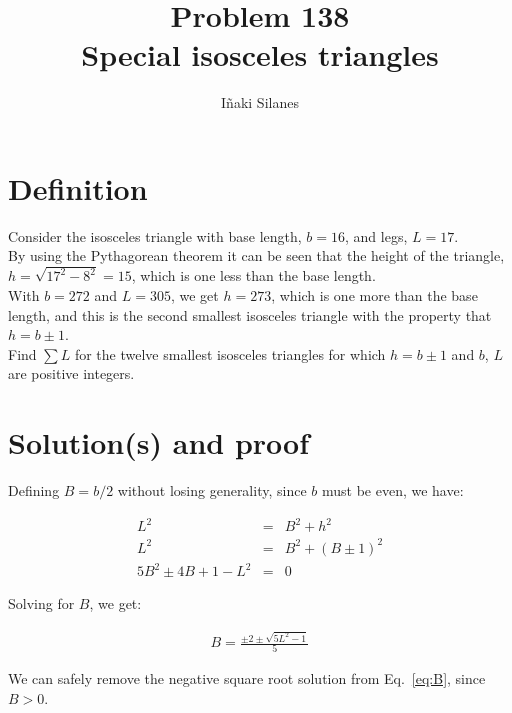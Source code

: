 \documentclass[english]{article}
\begin{document}
\newcommand{\mc}{\multicolumn}
\newcommand{\mr}{\multirow}
\newcommand{\cw}{\columnwidth}
\newcommand{\ig}[2]{\texttt{[image: \#2]}}

\title{Problem 138\\Special isosceles triangles}
\author{I\~naki Silanes}
\maketitle

\section{Definition}

Consider the isosceles triangle with base length, $b = 16$, and legs, $L = 17$.\\

By using the Pythagorean theorem it can be seen that the height of the triangle, $h = \sqrt{17^2 - 8^2} = 15$, which is one less than the base length.\\

With $b = 272$ and $L = 305$, we get $h = 273$, which is one more than the base length, and this is the second smallest isosceles triangle with the property that $h = b \pm 1$.\\

Find $\sum L$ for the twelve smallest isosceles triangles for which $h = b \pm 1$ and $b$, $L$ are positive integers.


\section{Solution(s) and proof}

Defining $B = b/2$ without losing generality, since $b$ must be even, we have:

\begin{eqnarray}
L^2 & = & B^2 + h^2 \\
L^2 & = & B^2 + (B \pm 1)^2 \\
5B^2 \pm 4B + 1 - L^2 & = & 0\label{eq:L2}
\end{eqnarray}

Solving for $B$, we get:

\begin{eqnarray}
B = \frac{\pm 2 \pm \sqrt{5 L^2 - 1}}{5} \label{eq:B}
\end{eqnarray}

We can safely remove the negative square root solution from Eq.~\ref{eq:B}, since $B > 0$.\\
\end{document}
